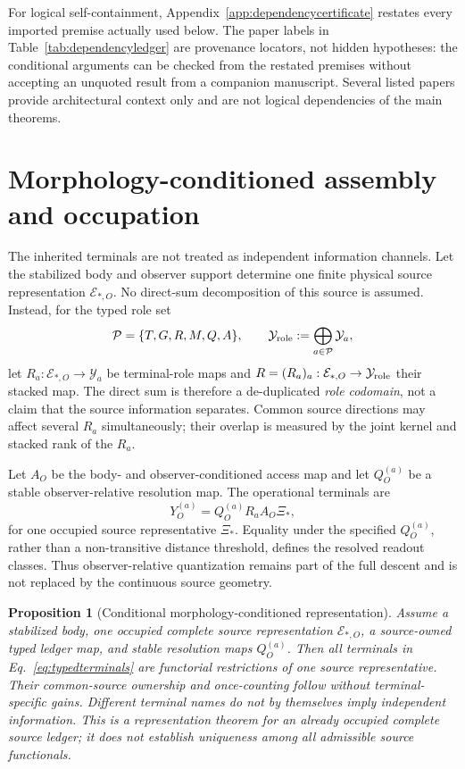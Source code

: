 \documentclass[11pt]{article}
\newtheorem{proposition}{Proposition}
\begin{document}
For logical self-containment, Appendix~\ref{app:dependencycertificate}
restates every imported premise actually used below.  The paper labels in
Table~\ref{tab:dependencyledger} are provenance locators, not hidden
hypotheses: the conditional
arguments can be checked from the restated premises without accepting an
unquoted result from a companion manuscript.  Several listed papers provide
architectural context only and are not logical dependencies of the main
theorems.

\section{Morphology-conditioned assembly and occupation}

The inherited terminals are not treated as independent information channels.
Let the stabilized body and observer support determine one finite physical
source representation $\mathcal E_{*,O}$.  No direct-sum decomposition of
this source is assumed.  Instead, for the typed role set
\begin{equation}
\mathcal P=\{T,G,R,M,Q,A\},
\qquad
\mathcal Y_{\rm role}:=\bigoplus_{a\in\mathcal P}\mathcal Y_a,
\label{eq:rolecodomain}
\end{equation}
let $R_a:\mathcal E_{*,O}\to\mathcal Y_a$ be terminal-role maps and
$R=(R_a)_a:\mathcal E_{*,O}\to\mathcal Y_{\rm role}$ their stacked map.
The direct sum is therefore a de-duplicated \emph{role codomain}, not a claim
that the source information separates.  Common source directions may affect
several $R_a$ simultaneously; their overlap is measured by the joint kernel
and stacked rank of the $R_a$.

Let $A_O$ be the body- and observer-conditioned access map and let
$Q_O^{(a)}$ be a stable observer-relative resolution map.  The operational
terminals are
\begin{equation}
Y_O^{(a)}=Q_O^{(a)}R_a A_O\Xi_*,
\label{eq:typedterminals}
\end{equation}
for one occupied source representative $\Xi_*$.  Equality under the specified
$Q_O^{(a)}$, rather than a non-transitive distance threshold, defines the
resolved readout classes.  Thus observer-relative quantization remains part
of the full descent and is not replaced by the continuous source geometry.

\begin{proposition}[Conditional morphology-conditioned representation]
\label{prop:moprassembly}
Assume a stabilized body, one occupied complete source representation
$\mathcal E_{*,O}$, a source-owned typed ledger map, and stable resolution
maps $Q_O^{(a)}$.  Then all terminals in Eq.~\eqref{eq:typedterminals} are
functorial restrictions of one source representative.  Their common-source
ownership and once-counting follow without terminal-specific gains.  Different
terminal names do not by themselves imply independent information.  This is
a representation theorem for an already occupied complete source ledger; it
does not establish uniqueness among all admissible source functionals.
\end{proposition}
\end{document}
